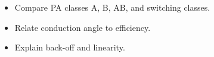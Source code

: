 \begin{objectives}
\begin{itemize}[leftmargin=1.4em,itemsep=2pt]
\item Compare PA classes A, B, AB, and switching classes.
\item Relate conduction angle to efficiency.
\item Explain back-off and linearity.
\end{itemize}
\end{objectives}
